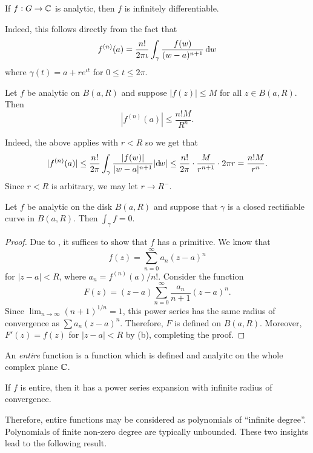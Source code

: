 	\begin{corollary}
		If $f:G\to\mathbb{C}$ is analytic, then $f$ is infinitely differentiable.
	\end{corollary}
	Indeed, this follows directly from the fact that
	\[ f^{(n)}(a) = \frac{n!}{2\pi\iota} \int_\gamma \frac{f(w)}{(w-a)^{n+1}} \dif w \]
	where $\gamma(t) = a+re^{\iota t}$ for $0 \le t \le 2\pi$.\\

	\begin{corollary}
		\label{theo: cauchys estimate}
		Let $f$ be analytic on $B(a,R)$ and suppose $|f(z)| \le M$ for all $z \in B(a,R)$. Then
		\[ |f^{(n)}(a)| \le \frac{n!M}{R^n}. \]
	\end{corollary}
	Indeed, the above applies with $r < R$ so we get that
	\[ |f^{(n)}(a)| \le \frac{n!}{2\pi} \int_\gamma \frac{|f(w)|}{|w-a|^{n+1}} |{\dif} {w}| \le \frac{n!}{2\pi} \cdot \frac{M}{r^{n+1}} \cdot 2\pi r = \frac{n!M}{r^n}. \]
	Since $r < R$ is arbitrary, we may let $r \to R^{-}$.

	\begin{prop}
		Let $f$ be analytic on the disk $B(a,R)$ and suppose that $\gamma$ is a closed rectifiable curve in $B(a,R)$. Then $\int_\gamma f = 0$.
	\end{prop}
	\begin{proof}
		Due to , it suffices to show that $f$ has a primitive. We know that
		\[ f(z) = \sum_{n=0}^{\infty} a_n (z-a)^n \]
		for $|z-a| < R$, where $a_n = f^{(n)}(a)/n!$. Consider the function
		\[ F(z) = (z-a) \sum_{n=0}^{\infty} \frac{a_n}{n+1} (z-a)^{n}. \]
		Since $\lim_{n\to\infty} (n+1)^{1/n} = 1$, this power series has the same radius of convergence as $\sum a_n (z-a)^n$. Therefore, $F$ is defined on $B(a,R)$. Moreover, $F'(z) = f(z)$ for $|z-a| < R$ by (b), completing the proof.
	\end{proof}

	\begin{fdef}
		An \emph{entire} function is a function which is defined and analyitc on the whole complex plane $\mathbb{C}$.
	\end{fdef}

	\begin{prop}
		If $f$ is entire, then it has a power series expansion with infinite radius of convergence.
	\end{prop}
	Therefore, entire functions may be considered as polynomials of ``infinite degree''. Polynomials of finite non-zero degree are typically unbounded. These two insights lead to the following result.

